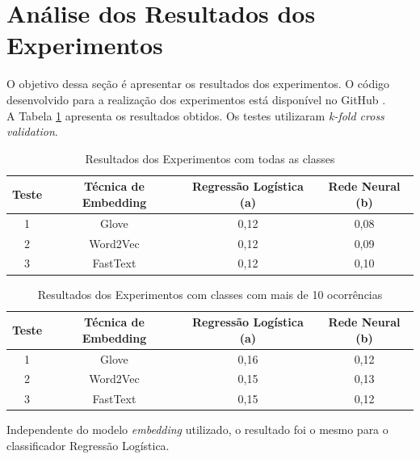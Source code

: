\documentclass{article}
\begin{document}

\section{Análise dos Resultados dos Experimentos\label{resultados}}

O objetivo dessa seção é apresentar os resultados dos experimentos. O código desenvolvido para a realização dos experimentos está disponível no GitHub \citep{codigo}.\\

A Tabela \ref{table:result} apresenta os resultados obtidos. Os testes utilizaram \textit{k-fold cross validation}.

\begin{table}[]
\begin{tabular}{|c|c|c|c|}
\hline
Teste & Técnica de Embedding & Regressão Logística (a) & Rede Neural (b) \\ \hline
1     & Glove                & 0,12                 & 0,08            \\ \hline
2     & Word2Vec             & 0,12                 & 0,09            \\ \hline
3     & FastText             & 0,12                 & 0,10            \\ \hline
\end{tabular}
\caption{Resultados dos Experimentos com todas as classes}
\label{table:result}
\end{table}

\begin{table}[]
\begin{tabular}{|c|c|c|c|}
\hline
Teste & Técnica de Embedding & Regressão Logística (a) & Rede Neural (b) \\ \hline
1     & Glove                & 0,16                 & 0,12            \\ \hline
2     & Word2Vec             & 0,15                 & 0,13            \\ \hline
3     & FastText             & 0,15                 & 0,12            \\ \hline
\end{tabular}
\caption{Resultados dos Experimentos com classes com mais de 10 ocorrências}
\label{table:result2}
\end{table}

Independente do modelo \textit{embedding} utilizado, o resultado foi o mesmo para o classificador Regressão Logística.\\
\end{document}
